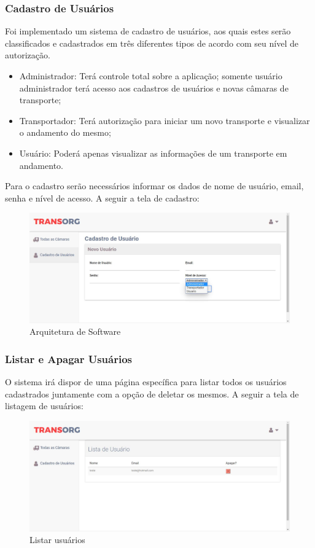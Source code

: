 \subsubsection{Cadastro de Usuários}
	Foi implementado um sistema de cadastro de usuários, aos quais estes serão classificados e cadastrados em três diferentes tipos de acordo com seu nível de autorização.

\begin{itemize}
\item Administrador: Terá controle total sobre a aplicação; somente usuário administrador terá acesso aos cadastros de usuários e novas câmaras de transporte;
\item Transportador:  Terá autorização para iniciar um novo transporte e visualizar o andamento do mesmo;
\item Usuário: Poderá apenas visualizar as informações de um transporte em andamento.
\end{itemize}

	Para o cadastro serão necessários informar os dados de nome de usuário, email, senha e nível de acesso. A seguir a tela de cadastro:

\begin{figure}[H]
\centering
\includegraphics[width=16cm]{figuras/cadastro_software.jpg}
\caption{Arquitetura de Software}
\end{figure}

\subsubsection{Listar e Apagar Usuários}
	O sistema irá dispor de uma página específica para listar todos os usuários cadastrados juntamente com a opção de deletar os mesmos. A seguir a tela de listagem de usuários:

\begin{figure}[H]
\centering
\includegraphics[width=16cm]{figuras/listaUsuarios_software.jpg}
\caption{Listar usuários}
\end{figure}

